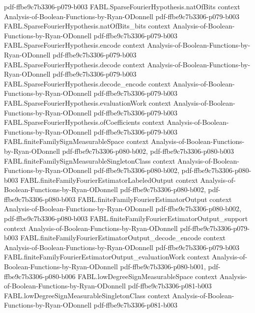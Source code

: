 \begin{theorem}
  {pdf-ffbe9c7b3306-p079-b003}
\proofstep
  {FABL.SparseFourierHypothesis.natOfBits}
  {context}
  {Analysis-of-Boolean-Functions-by-Ryan-ODonnell}
  {pdf-ffbe9c7b3306-p079-b003}
\proofstep
  {FABL.SparseFourierHypothesis.natOfBits_bits}
  {context}
  {Analysis-of-Boolean-Functions-by-Ryan-ODonnell}
  {pdf-ffbe9c7b3306-p079-b003}
\proofstep
  {FABL.SparseFourierHypothesis.encode}
  {context}
  {Analysis-of-Boolean-Functions-by-Ryan-ODonnell}
  {pdf-ffbe9c7b3306-p079-b003}
\proofstep
  {FABL.SparseFourierHypothesis.decode}
  {context}
  {Analysis-of-Boolean-Functions-by-Ryan-ODonnell}
  {pdf-ffbe9c7b3306-p079-b003}
\proofstep
  {FABL.SparseFourierHypothesis.decode_encode}
  {context}
  {Analysis-of-Boolean-Functions-by-Ryan-ODonnell}
  {pdf-ffbe9c7b3306-p079-b003}
\proofstep
  {FABL.SparseFourierHypothesis.evaluationWork}
  {context}
  {Analysis-of-Boolean-Functions-by-Ryan-ODonnell}
  {pdf-ffbe9c7b3306-p079-b003}
\proofstep
  {FABL.SparseFourierHypothesis.ofCoefficients}
  {context}
  {Analysis-of-Boolean-Functions-by-Ryan-ODonnell}
  {pdf-ffbe9c7b3306-p079-b003}
\proofstep
  {FABL.finiteFamilySignMeasurableSpace}
  {context}
  {Analysis-of-Boolean-Functions-by-Ryan-ODonnell}
  {pdf-ffbe9c7b3306-p080-b002,
    pdf-ffbe9c7b3306-p080-b003}
\proofstep
  {FABL.finiteFamilySignMeasurableSingletonClass}
  {context}
  {Analysis-of-Boolean-Functions-by-Ryan-ODonnell}
  {pdf-ffbe9c7b3306-p080-b002,
    pdf-ffbe9c7b3306-p080-b003}
\proofstep
  {FABL.finiteFamilyFourierEstimatorLabeledOutput}
  {context}
  {Analysis-of-Boolean-Functions-by-Ryan-ODonnell}
  {pdf-ffbe9c7b3306-p080-b002,
    pdf-ffbe9c7b3306-p080-b003}
\proofstep
  {FABL.finiteFamilyFourierEstimatorOutput}
  {context}
  {Analysis-of-Boolean-Functions-by-Ryan-ODonnell}
  {pdf-ffbe9c7b3306-p080-b002,
    pdf-ffbe9c7b3306-p080-b003}
\proofstep
  {FABL.finiteFamilyFourierEstimatorOutput_support}
  {context}
  {Analysis-of-Boolean-Functions-by-Ryan-ODonnell}
  {pdf-ffbe9c7b3306-p079-b003}
\proofstep
  {FABL.finiteFamilyFourierEstimatorOutput_decode_encode}
  {context}
  {Analysis-of-Boolean-Functions-by-Ryan-ODonnell}
  {pdf-ffbe9c7b3306-p079-b003}
\proofstep
  {FABL.finiteFamilyFourierEstimatorOutput_evaluationWork}
  {context}
  {Analysis-of-Boolean-Functions-by-Ryan-ODonnell}
  {pdf-ffbe9c7b3306-p080-b001,
    pdf-ffbe9c7b3306-p080-b006}
\proofstep
  {FABL.lowDegreeSignMeasurableSpace}
  {context}
  {Analysis-of-Boolean-Functions-by-Ryan-ODonnell}
  {pdf-ffbe9c7b3306-p081-b003}
\proofstep
  {FABL.lowDegreeSignMeasurableSingletonClass}
  {context}
  {Analysis-of-Boolean-Functions-by-Ryan-ODonnell}
  {pdf-ffbe9c7b3306-p081-b003}

\end{theorem}
